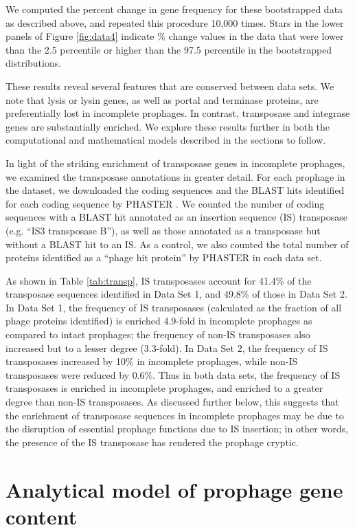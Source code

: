 We computed the percent change in gene frequency for these bootstrapped data as described above, and repeated this procedure 10,000 times.  Stars in the lower panels of Figure \ref{fig:data4} indicate \% change values in the data that were lower than the 2.5 percentile or higher than the 97.5 percentile in the bootstrapped distributions.

These results reveal several features that are conserved between data sets.  We note that lysis or lysin genes, as well as portal and terminase proteins, are preferentially lost in incomplete prophages.  In contrast, transposase and integrase genes are substantially enriched.  We explore these results further in both the computational and mathematical models described in the sections to follow.

In light of the striking enrichment of transposase genes in incomplete prophages, we examined the transposase annotations in greater detail.  For each prophage in the dataset, we downloaded the coding sequences and the BLAST hits identified for each coding sequence by PHASTER \cite{arndt_phaster:_2016}.  We counted the number of coding sequences with a BLAST hit annotated as an insertion sequence (IS) transposase (e.g. ``IS3 transposase B''), as well as those annotated as a transposase but without a BLAST hit to an IS.  As a control, we also counted the total number of proteins identified as a ``phage hit protein'' by PHASTER in each data set.  

As shown in Table \ref{tab:transp}, IS transposases account for 41.4\% of the transposase sequences identified in Data Set 1, and 49.8\% of those in Data Set 2.  In Data Set 1, the frequency of IS transposases (calculated as the fraction of all phage proteins identified) is enriched 4.9-fold in incomplete prophages as compared to intact prophages; the frequency of non-IS transposases also increased but to a lesser degree (3.3-fold).  In Data Set 2, the frequency of IS transposases increased by 10\% in incomplete prophages, while non-IS transposases were reduced by 0.6\%.  Thus in both data sets, the frequency of IS transposases is enriched in incomplete prophages, and enriched to a greater degree than non-IS transposases.  As discussed further below, this suggests that the enrichment of transposase sequences in incomplete prophages may be due to the disruption of essential prophage functions due to IS insertion; in other words, the presence of the IS transposase has rendered the prophage cryptic.


\section{Analytical model of prophage gene content}

